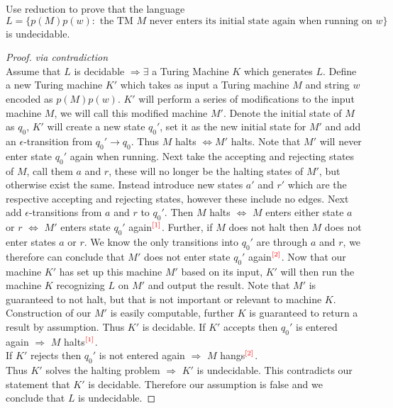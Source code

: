 \documentclass[12pt]{jhwhw}
\begin{document}
	Use reduction to prove that the language
	$$
		L = \{p(M)p(w) :\text{ the TM $M$ never enters its initial state again when
			running on $w$}\}
	$$
	is undecidable.

\solution

	\begin{proof} \textit{via contradiction} \\
		Assume that $L$ is decidable $\Rightarrow \exists$ a Turing Machine $K$ which generates $L$.
		Define a new Turing machine $K'$ which takes as input a Turing machine $M$ and string $w$
		encoded as $p(M)p(w)$. $K'$ will perform a series of modifications to the input machine $M$,
		we will call this modified machine $M'$.
		Denote the initial state of $M$ as $q_0$, $K'$ will create a new state $q_0'$, set it as the
		new initial state for $M'$ and add an $\epsilon$-transition from $q_0'\rightarrow q_0$. Thus
		$M$ halts $\Leftrightarrow M'$ halts. Note that $M'$ will never enter state $q_0'$ again 
		when running.
		\bigbreak
		Next take the accepting and rejecting states of $M$, call them $a$ and $r$, these will no longer
		be the halting states of $M'$, but otherwise exist the same. Instead introduce new states $a'$ and $r'$
		which are the respective accepting and rejecting states, however these include no edges. Next add
		$\epsilon$-transitions from $a$ and $r$ to $q_0'$. 
		Then $M$ halts $\Leftrightarrow$ $M$ enters either
		state $a$ or $r$ $\Leftrightarrow$ $M'$ enters state $q_0'$ again$^{\textcolor{red}{[1]}}$. 
		Further, if $M$ does not halt then
		$M$ does not enter states $a$ or $r$. We know the only transitions into $q_0'$ are through $a$ and $r$, we
		therefore can conclude that $M'$ does not enter state $q_0'$ again$^{\textcolor{red}{[2]}}$.
		\bigbreak
		Now that our machine $K'$ has set up this machine $M'$ based on its input, $K'$ will then run
		the machine $K$ recognizing $L$ on $M'$ and output the result. 
		Note that $M'$ is guaranteed to not halt, but that is not
		important or relevant to machine $K.$ Construction of our $M'$ is easily computable, further $K$ is guaranteed
		to return a result by assumption. Thus $K'$ is decidable.
		\bigbreak
		If $K'$ accepts then $q_0'$ is entered again $\Rightarrow$ $M$ halts$^{\textcolor{red}{[1]}}$. \\
		If $K'$ rejects then $q_0'$ is not entered again $\Rightarrow$ $M$ hangs$^{\textcolor{red}{[2]}}$. \\
		\bigbreak
		Thus $K'$ solves the halting problem $\Rightarrow$ $K'$ is undecidable. This contradicts
		our statement that $K'$ is decidable. Therefore our assumption is false and we conclude
		that $L$ is undecidable.
	\end{proof}
\end{document}
